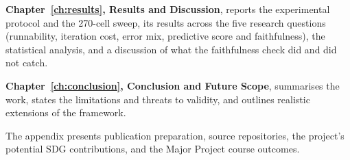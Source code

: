 \textbf{Chapter~\ref*{ch:results}, Results and Discussion},
reports the experimental protocol and the 270-cell sweep, its
results across the five research questions (runnability, iteration
cost, error mix, predictive score and faithfulness), the statistical
analysis, and a discussion of what the faithfulness check did and did
not catch.

\textbf{Chapter~\ref*{ch:conclusion}, Conclusion and Future
Scope}, summarises the work, states the limitations and threats to
validity, and outlines realistic extensions of the framework.

The appendix presents publication preparation, source repositories,
the project's potential SDG contributions, and the Major Project
course outcomes.
